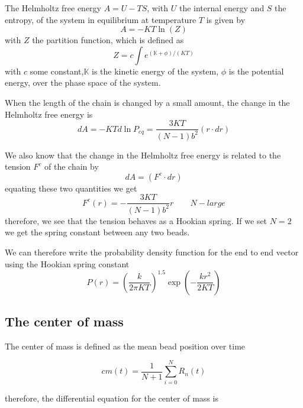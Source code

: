 \documentclass{report}
\begin{document}
 The Helmholtz free energy $A=U-TS$, with $U$ the internal energy and $S$ the entropy, of the system in equilibrium at temperature $T$ is given by 
\begin{equation*}
A=-KT\ln(Z)
\end{equation*}
with $Z$ the partition function, which is defined as 
\begin{equation*}
Z=c\int e^{(\mathbb{K+\phi})/(KT)}
\end{equation*}
with $c$ some constant,$\mathbb{K}$ is the kinetic energy of the system, $\mathbb{\phi}$ is the potential energy, over the phase space of the system. 

When the length of the chain is changed by a small amount, the change in the Helmholtz free energy is 
\begin{equation*}
dA=-KTd\ln{P_{eq}}=\frac{3KT}{(N-1)b^2}(r\cdot dr)
\end{equation*}

We also know that the change in the Helmholtz free energy is related to the tension $F^c$ of the chain by 
\begin{equation*}
dA=(F^c\cdot dr)
\end{equation*}
equating these two quantities we get 
\begin{equation*}
F^c(r) = -\frac{3KT}{(N-1)b^2}r	 \qquad N-large
\end{equation*}
therefore, we see that the tension behaves as a Hookian spring. If we set $N=2$ we get the spring constant between any two beads.

We can therefore write the probability density function for the end to end vector using the Hookian spring constant
\begin{equation*}
P(r)= \left(\frac{k}{2\pi KT}\right)^{1.5}\exp\left(-\frac{k r^2}{2KT}\right)
\end{equation*}

\subsection{The center of mass}\label{subsection_theCenterOfMass}

The center of mass is defined as the mean bead position over time 

\begin{equation*}
cm(t) = \frac{1}{N+1}\sum_{i=0}^N{R_n(t)}
\end{equation*}

therefore, the differential equation for the center of mass is 
\end{document}
